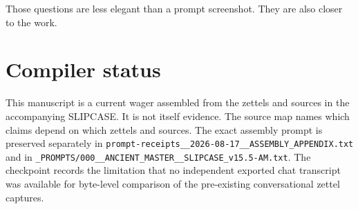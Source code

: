 \documentclass[11pt]{article}
\begin{document}
Those questions are less elegant than a prompt screenshot. They are also closer to the work.

\appendix
\section{Compiler status}
This manuscript is a current wager assembled from the zettels and sources in the accompanying SLIPCASE. It is not itself evidence. The source map names which claims depend on which zettels and sources. The exact assembly prompt is preserved separately in \texttt{prompt-receipts\_\_2026-08-17\_\_ASSEMBLY\_APPENDIX.txt} and in \texttt{\_PROMPTS/000\_\_ANCIENT\_MASTER\_\_SLIPCASE\_v15.5-AM.txt}. The checkpoint records the limitation that no independent exported chat transcript was available for byte-level comparison of the pre-existing conversational zettel captures.
\end{document}

